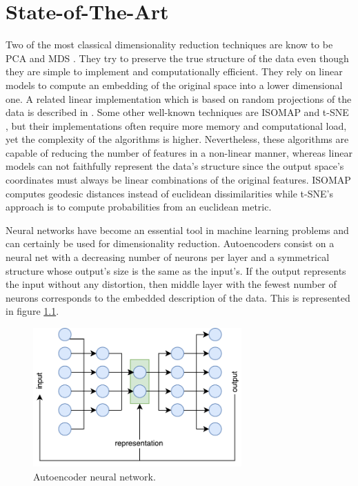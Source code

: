\documentclass[a4paper,11pt,spanish]{report}
\begin{document}

\chapter{State-of-The-Art}
\label{chap:stt}

Two of the most classical dimensionality reduction techniques are know to be PCA \citep{pca} and MDS \citep{mds}. They try to preserve the true structure of the data even though they are simple to implement and computationally efficient. They rely on linear models to compute an embedding of the original space into a lower dimensional one. A related linear implementation which is based on random projections of the data is described in \citep{rproj, rproj2}. Some other well-known techniques are ISOMAP \citep{isomap} and t-SNE \citep{tsne}, but their implementations often require more memory and computational load, yet the complexity of the algorithms is higher. Nevertheless, these algorithms are capable of reducing the number of features in a non-linear manner, whereas linear models can not faithfully represent the data's structure since the output space's coordinates must always be linear combinations of the original features. ISOMAP computes geodesic distances instead of euclidean dissimilarities while t-SNE's approach is to compute probabilities from an euclidean metric.

Neural networks have become an essential tool in machine learning problems and can certainly be used for dimensionality reduction. Autoencoders \citep{auto2, auto} consist on a neural net with a  decreasing number of neurons per layer and a symmetrical structure whose output's size is the same as the input's. If the output represents the input without any distortion, then middle layer with the fewest number of neurons corresponds to the embedded description of the data. This is represented in figure \ref{autoencoder}.

\begin{figure}[h]
\centering
\includegraphics[width=8cm]{figures/autoencoder.pdf}
\caption{\label{autoencoder}Autoencoder neural network.}
\end{figure}
\end{document}
